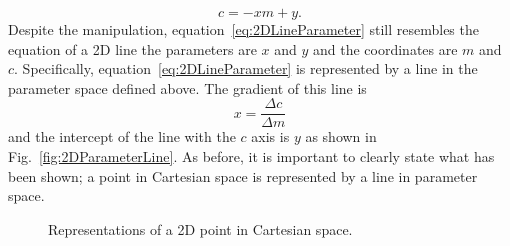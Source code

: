 \begin{equation}
  c = -xm + y.
  \label{eq:2DLineParameter}
\end{equation}
Despite the manipulation, equation~\ref{eq:2DLineParameter} still resembles the equation of a 2D line the parameters are $x$ and $y$ and the coordinates are $m$ and $c$.  Specifically, equation~\ref{eq:2DLineParameter} is represented by a line in the parameter space defined above.  The gradient of this line is 
\begin{equation}
  x = \frac{\Delta c}{\Delta m}
  \label{eq:2DLineGradientParameterSpace}
\end{equation}
and the intercept of the line with the $c$ axis is $y$ as shown in Fig.~\ref{fig:2DParameterLine}.  As before, it is important to clearly state what has been shown; a point in Cartesian space is represented by a line in parameter space.
\begin{figure}%
  \centering
  \caption{Representations of a 2D point in Cartesian space.}
  \label{fig:2DCartesianPointAndParameterLine}
\end{figure}


